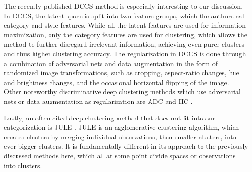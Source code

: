 			The recently published \ac{DCCS} \cite{dccs} method is especially interesting to our discussion.
			In \ac{DCCS}, the latent space is split into two feature groups, which the authors call category and style features.
			While all the latent features are used for information maximization, only the category features are used for clustering, which allows the method to further disregard irrelevant information, achieving even purer clusters and thus higher clustering accuracy.
			The regularization in \ac{DCCS} is done through a combination of adversarial nets and data augmentation in the form of randomized image transformations, such as cropping, aspect-ratio changes, hue and brightness changes, and the occasional horizontal flipping of the image.
			Other noteworthy discriminative deep clustering methods which use adversarial nets or data augmentation as regularization are \ac{ADC} \cite{adc} and \ac{IIC} \cite{iic}.
			
			Lastly, an often cited deep clustering method that does not fit into our categorization is \ac{JULE} \cite{jule}.
			\ac{JULE} is an agglomerative clustering algorithm, which creates clusters by merging individual observations, then smaller clusters, into ever bigger clusters.
			It is fundamentally different in its approach to the previously discussed methods here, which all at some point divide spaces or observations into clusters.
			

